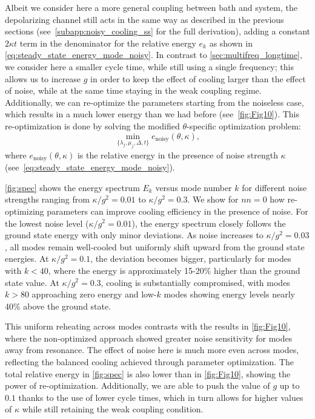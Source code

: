 \documentclass[aps,prx,twocolumn,superscriptaddress,nofootinbib,nolongbibliography,nobalancelastpage,10pt,floatfix]{revtex4-2}
\begin{document}
Albeit we consider here a more general coupling between bath and system, the depolarizing channel still acts in the same way as described in the previous sections (see~\cref{subapp:noisy_cooling_ss} for the full derivation), adding a constant $2\kappa t$ term in the denominator for the relative energy $e_k$ as shown in \cref{eq:steady_state_energy_mode_noisy}. In contrast to \cref{sec:multifreq_longtime}, we consider here a smaller cycle time, while still using a single frequency; this allows us to increase $g$ in order to keep the effect of cooling larger than the effect of noise, while at the same time staying in the weak coupling regime. Additionally, we can re-optimize the parameters starting from the noiseless case, which results in a much lower energy than we had before (see~\cref{fig:Fig10}). This re-optimization is done by solving the modified $\theta$-specific optimization problem:
\begin{equation}
    \min_{\{\lambda_j, \mu_j, \Delta, t\}} e_{\text{noisy}}(\theta,\kappa),
    \label{eq:dep_noise_optimization}
\end{equation}
where $e_{\text{noisy}}(\theta,\kappa)$ is the relative energy in the presence of noise strength $\kappa$ (see~\cref{eq:steady_state_energy_mode_noisy}).

\cref{fig:spec} shows the energy spectrum $E_k$ versus mode number $k$ for different noise strengths ranging from $\kappa/g^2=0.01$ to $\kappa/g^2=0.3$. We show for $nn=0$ how re-optimizing parameters can improve cooling efficiency in the presence of noise. For the lowest noise level ($\kappa/g^2=0.01$), the energy spectrum closely follows the ground state energy with only minor deviations.
As noise increases to $\kappa/g^2=0.03$, all modes remain well-cooled but uniformly shift upward from the ground state energies. At $\kappa/g^2=0.1$, the deviation becomes bigger, particularly for modes with $k<40$, where the energy is approximately 15-20\% higher than the ground state value. At $\kappa/g^2=0.3$, cooling is substantially compromised, with modes $k>80$ approaching zero energy and low-$k$ modes showing energy levels nearly 40\% above the ground state.

This uniform reheating across modes contrasts with the results in \cref{fig:Fig10}, where the non-optimized approach showed greater noise sensitivity for modes away from resonance. The effect of noise here is much more even across modes, reflecting the balanced cooling achieved through parameter optimization. The total relative energy in \cref{fig:spec} is also lower than in \cref{fig:Fig10}, showing the power of re-optimization. Additionally, we are able to push the value of $g$ up to $0.1$ thanks to the use of lower cycle times, which in turn allows for higher values of $\kappa$ while still retaining the weak coupling condition.
\end{document}
